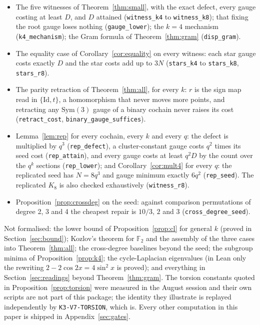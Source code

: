 \documentclass[11pt]{article}
\theoremstyle{remark}\newtheorem{remark}[theorem]{Remark}
\newcommand{\Sym}{\mathrm{Sym}}\newcommand{\dH}{d_H}\newcommand{\F}{\mathbb{F}}\newcommand{\Z}{\mathbb{Z}}
\newcommand{\Id}{\mathrm{Id}}\newcommand{\Tr}{\operatorname{Tr}}
\begin{document}
\begin{itemize}
\item The five witnesses of Theorem~\ref{thm:small}, with the exact defect, every gauge costing at least $D$, and $D$ attained (\texttt{witness\_k4} to \texttt{witness\_k8}); that fixing the root gauge loses nothing (\texttt{gauge\_lower}); the $k=4$ mechanism (\texttt{k4\_mechanism}); the Gram formula of Theorem~\ref{thm:gram} (\texttt{disp\_gram}).
\item The equality case of Corollary~\ref{cor:equality} on every witness: each star gauge costs exactly $D$ and the star costs add up to $3N$ (\texttt{stars\_k4} to \texttt{stars\_k8}, \texttt{stars\_r8}).
\item The parity retraction of Theorem~\ref{thm:all}, for every $k$: $r$ is the sign map read in $\{\Id,t\}$, a homomorphism that never moves more points, and retracting any $\Sym(3)$ gauge of a binary cochain never raises its cost (\texttt{retract\_cost}, \texttt{binary\_gauge\_suffices}).
\item Lemma~\ref{lem:rep} for every cochain, every $k$ and every $q$: the defect is multiplied by $q^3$ (\texttt{rep\_defect}), a cluster-constant gauge costs $q^2$ times its seed cost (\texttt{rep\_attain}), and every gauge costs at least $q^2D$ by the count over the $q^k$ sections (\texttt{rep\_lower}); and Corollary~\ref{cor:mult4} for every $q$: the replicated seed has $N=8q^3$ and gauge minimum exactly $6q^2$ (\texttt{rep\_seed}). The replicated $K_8$ is also checked exhaustively (\texttt{witness\_r8}).
\item Proposition~\ref{prop:crossdeg} on the seed: against comparison permutations of degree 2, 3 and 4 the cheapest repair is $10/3$, $2$ and $3$ (\texttt{cross\_degree\_seed}).
\end{itemize}

Not formalised: the lower bound of Proposition~\ref{prop:cl} for general $k$ (proved in Section~\ref{sec:bound}); Kozlov's theorem for $\F_2$ and the assembly of the three cases into Theorem~\ref{thm:all}; the cross-degree baselines beyond the seed; the subgroup minima of Proposition~\ref{prop:k4}; the cycle-Laplacian eigenvalues (in Lean only the rewriting $2-2\cos2x=4\sin^2x$ is proved); and everything in Section~\ref{sec:readings} beyond Theorem~\ref{thm:gram}. The torsion constants quoted in Proposition~\ref{prop:torsion} were measured in the August session and their own scripts are not part of this package; the identity they illustrate is replayed independently by \texttt{K3-V7-TORSION}, which is. Every other computation in this paper is shipped in Appendix~\ref{sec:gates}.
\end{document}
